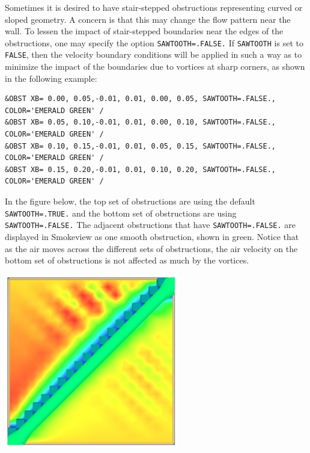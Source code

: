 \documentclass[11pt]{book}
\newcommand{\ct}{\tt\small}
\begin{document}
Sometimes it is desired to have stair-stepped obstructions representing curved or sloped geometry. A concern is that this may
change the flow pattern near the wall. To lessen the impact of stair-stepped boundaries near the edges of the obstructions,
one may specify the option {\ct SAWTOOTH=.FALSE.} If {\ct SAWTOOTH} is set to {\ct FALSE}, then the velocity boundary conditions will be applied in
such a way as to minimize the impact of the boundaries due to vortices at sharp corners, as shown in the following example:

\scriptsize
\begin{verbatim}
&OBST XB= 0.00, 0.05,-0.01, 0.01, 0.00, 0.05, SAWTOOTH=.FALSE., COLOR='EMERALD GREEN' /
&OBST XB= 0.05, 0.10,-0.01, 0.01, 0.00, 0.10, SAWTOOTH=.FALSE., COLOR='EMERALD GREEN' /
&OBST XB= 0.10, 0.15,-0.01, 0.01, 0.05, 0.15, SAWTOOTH=.FALSE., COLOR='EMERALD GREEN' /
&OBST XB= 0.15, 0.20,-0.01, 0.01, 0.10, 0.20, SAWTOOTH=.FALSE., COLOR='EMERALD GREEN' /
\end{verbatim}\normalsize

In the figure below, the top set of obstructions are using the default {\ct SAWTOOTH=.TRUE.} and the bottom set of
obstructions are using {\ct SAWTOOTH=.FALSE.} The adjacent obstructions that have {\ct SAWTOOTH=.FALSE.} are displayed
in Smokeview as one smooth obstruction, shown in green. Notice that as the air moves across the different sets of obstructions,
the air velocity on the bottom set of obstructions is not affected as much by the vortices.

\begin{center}
\includegraphics[width=3in]{FIGURES/sawtooth.jpg}
\end{center}

\clearpage
\end{document}
